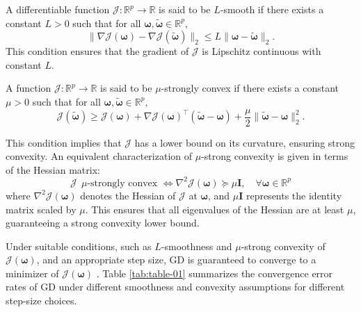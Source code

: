 \begin{definition}
A differentiable function $\mathcal{J}: \mathbb{R}^p \to \mathbb{R}$ is said to be $L$-smooth if there exists a constant $L > 0$ such that for all $\bm\omega, \bm{\tilde{\omega}} \in \mathbb{R}^p$,\\
\begin{equation} \label{eq:L_smoothness}
    \| \nabla \mathcal{J}(\bm{\omega}) - \nabla \mathcal{J}(\bm{\tilde{\omega}}) \|_2 \leq L \| \bm{\omega} - \bm{\tilde{\omega}} \|_2.
\end{equation}
This condition ensures that the gradient of $\mathcal{J}$ is Lipschitz continuous with constant $L$.
\end{definition}
\newpage
\begin{definition}
A function $\mathcal{J}: \mathbb{R}^p \to \mathbb{R}$ is said to be $\mu$-strongly convex if there exists a constant $\mu > 0$ such that for all $\bm\omega, \bm{\tilde{\omega}} \in \mathbb{R}^p$,\\
\begin{equation} \label{eq:mu_strong_convexity}
    \mathcal{J}(\bm{\tilde{\omega}}) \geq \mathcal{J}(\bm\omega) + \nabla \mathcal{J}(\bm\omega)^{\top}(\bm{\tilde{\omega}} - \bm\omega) + \frac{\mu}{2} \| \bm{\tilde{\omega}} - \bm\omega \|_2^2.
\end{equation}
\end{definition}
This condition implies that $\mathcal{J}$ has a lower bound on its curvature, ensuring strong convexity. An equivalent characterization of $\mu$-strong convexity is given in terms of the Hessian matrix:\\
\begin{equation} \label{eq:hessian_characterization}
    \mathcal{J} ~~ \mu\text{-strongly convex~} \Leftrightarrow \nabla^2 \mathcal{J}(\bm\omega) \succeq \mu \mathbf{I}, \quad \forall \bm\omega \in \mathbb{R}^p
\end{equation}
where $\nabla^2 \mathcal{J}(\bm\omega)$ denotes the Hessian of $\mathcal{J}$ at $\bm\omega$, and $\mu \mathbf{I}$ represents the identity matrix scaled by $\mu$. This ensures that all eigenvalues of the Hessian are at least $\mu$, guaranteeing a strong convexity lower bound.

Under suitable conditions, such as $L$-smoothness and $\mu$-strong convexity of $\mathcal{J}(\bm\omega)$, and an appropriate step size, GD is guaranteed to converge to a minimizer of $\mathcal{J}(\bm\omega)$ \cite{garrigos2023handbook}. Table \ref{tab:table-01} summarizes the convergence error rates of GD under different smoothness and convexity assumptions for different step-size choices.


